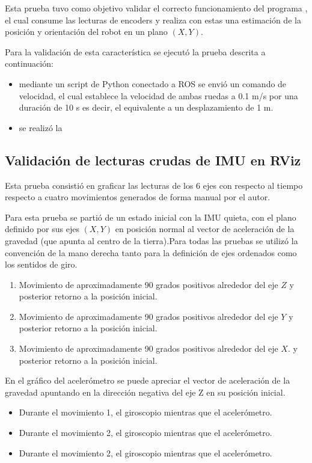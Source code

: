Esta prueba tuvo como objetivo validar el correcto funcionamiento del programa , el cual consume las lecturas de encoders y realiza con estas una estimación de la posición y orientación del robot en un plano $(X,Y)$.

Para la validación de esta característica se ejecutó la prueba descrita a continuación:

\begin{itemize}
    \item mediante un script de Python conectado a ROS se envió un comando de velocidad, el cual establece la velocidad de ambas ruedas a 0.1 m/s por una duración de 10 s es decir, el equivalente a un desplazamiento de 1 m.
    \item se realizó la
\end{itemize}

\subsection{Validación de lecturas crudas de IMU en RViz}

Esta prueba consistió en graficar las lecturas de los 6 ejes con respecto al tiempo respecto a cuatro movimientos generados de forma manual por el autor.

Para esta prueba se partió de un estado inicial con la IMU quieta, con el plano definido por sus ejes $(X,Y)$ en posición normal al vector de aceleración de la gravedad (que apunta al centro de la tierra).Para todas las pruebas se utilizó la convención de la mano derecha tanto para la definición de ejes ordenados como los sentidos de giro.

\begin{enumerate}
    \item Movimiento de aproximadamente 90 grados positivos alrededor del eje $Z$ y posterior retorno a la posición inicial.
    \item Movimiento de aproximadamente 90 grados positivos alrededor del eje $Y$ y posterior retorno a la posición inicial.
    \item Movimiento de aproximadamente 90 grados positivos alrededor del eje $X$. y posterior retorno a la posición inicial.
\end{enumerate}

En el gráfico del acelerómetro se puede apreciar el vector de aceleración de la gravedad apuntando en la dirección negativa del eje Z en su posición inicial.
\begin{itemize}
    \item Durante el movimiento 1, el giroscopio mientras que el acelerómetro.
    \item Durante el movimiento 2, el giroscopio mientras que el acelerómetro.
    \item Durante el movimiento 2, el giroscopio mientras que el acelerómetro.
\end{itemize}

